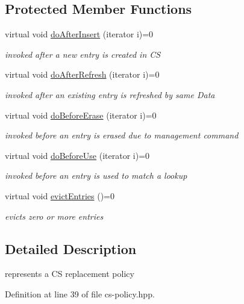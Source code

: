 \subsection*{Protected Member Functions}
\begin{DoxyCompactItemize}
\item 
virtual void \hyperlink{classnfd_1_1cs_1_1Policy_a4dadb2826887309843ebb52747072958}{do\+After\+Insert} (iterator i)=0
\begin{DoxyCompactList}\small\item\em invoked after a new entry is created in CS \end{DoxyCompactList}\item 
virtual void \hyperlink{classnfd_1_1cs_1_1Policy_ac7c947c857abb4ad6a565b85e519a194}{do\+After\+Refresh} (iterator i)=0
\begin{DoxyCompactList}\small\item\em invoked after an existing entry is refreshed by same Data \end{DoxyCompactList}\item 
virtual void \hyperlink{classnfd_1_1cs_1_1Policy_ab43a284d708ac4bb40220e85f379a053}{do\+Before\+Erase} (iterator i)=0
\begin{DoxyCompactList}\small\item\em invoked before an entry is erased due to management command \end{DoxyCompactList}\item 
virtual void \hyperlink{classnfd_1_1cs_1_1Policy_ab8224c56d8f3e3aa0b8fbb7129b2af69}{do\+Before\+Use} (iterator i)=0
\begin{DoxyCompactList}\small\item\em invoked before an entry is used to match a lookup \end{DoxyCompactList}\item 
virtual void \hyperlink{classnfd_1_1cs_1_1Policy_a5f6611c1dba23e82cc8828eff10169d0}{evict\+Entries} ()=0
\begin{DoxyCompactList}\small\item\em evicts zero or more entries \end{DoxyCompactList}\end{DoxyCompactItemize}


\subsection{Detailed Description}
represents a CS replacement policy 

Definition at line 39 of file cs-\/policy.\+hpp.



